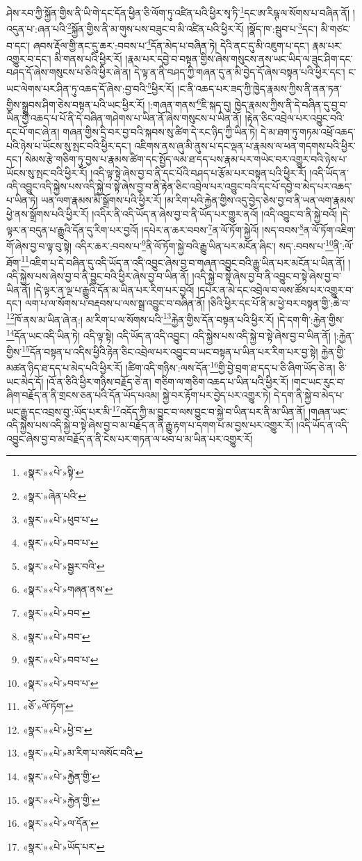 ཤེས་རབ་ཀྱི་སྐྱོན་གྱིས་ནི་ཡི་གེ་དང་དོན་ཕྱིན་ཅི་ལོག་ཏུ་འཛིན་པའི་ཕྱིར་སྭ་ཏི་\footnote{«སྣར་»«པེ་»སྟི་}དང་ཨ་རིཥྚ་ལ་སོགས་པ་བཞིན་ནོ། །འདུན་པ་:ཞན་པའི་\footnote{«སྣར་»ཞེན་པའི་}སྐྱོན་གྱིས་ནི་མ་གུས་པས་བཟུང་བ་མི་འཛིན་པའི་ཕྱིར་རོ། །སྣོད་ཁ་:སྦུབ་པ་\footnote{«སྣར་»«པེ་»ཕུབ་པ་}དང་། མི་གཙང་བ་དང་། ཞབས་རྡོལ་གྱི་ནང་དུ་ཆར་:བབས་པ་\footnote{«སྣར་»«པེ་»བབ་པ་}དོན་མེད་པ་བཞིན་ཏེ། དེའི་ནང་དུ་མི་འཇུག་པ་དང་། རྣམ་པར་འགྱུར་བ་དང་། མི་གནས་པའི་ཕྱིར་རོ། །རྣམ་པར་དབྱེ་བ་བསྟན་གྱིས་ཞེས་གསུངས་ནས་ཡང་ཡིད་ལ་ཟུང་ཤིག་དང་བཤད་དོ་ཞེས་གསུངས་པ་ཅིའི་ཕྱིར་ཞེ་ན། དེ་ལྟ་ན་ནི་བཤད་ཀྱི་གཞན་དུ་ན་མི་བྱེད་དོ་ཞེས་བསྟན་པའི་ཕྱིར་དང་། ང་ཡང་ལེགས་པར་ཤིན་ཏུ་འཆད་དོ་ཞེས་:བྱ་བའི་\footnote{«སྣར་»«པེ་»སྦྱར་བའི་}ཕྱིར་རོ། །ང་ནི་འཆད་པར་ཟད་ཀྱི་ཁྱེད་རྣམས་ཀྱིས་ནི་ནན་ཏན་གྱིས་སྒྲུབས་ཤིག་ཅེས་བསྟན་པའི་ཡང་ཕྱིར་རོ། །:གཞན་གནས་\footnote{«སྣར་»«པེ་»གཞན་ནས་}ཇི་སྐད་དུ། ཁྱེད་རྣམས་ཀྱིས་ནི་དེ་བཞིན་དུ་བྱ་བ་ཡིན་གྱི་འཆད་པ་པོ་ནི་དེ་བཞིན་གཤེགས་པ་ཡིན་ནོ་ཞེས་གསུངས་པ་ཡིན་ནོ། །རྟེན་ཅིང་འབྲེལ་པར་འབྱུང་བའི་དང་པོ་གང་ཞེ་ན། གཞན་གྱིས་དྲི་བར་བྱ་བའི་སྐབས་སུ་ཚིག་དེ་རང་ཉིད་ཀྱི་ཡིན་ཏེ། དེ་མ་ཐག་ཏུ་གཏམ་འཕྲོ་འཆད་པའི་ཉེས་པ་ཡོངས་སུ་སྤང་བའི་ཕྱིར་དང་། འཇིགས་ནས་ཞུ་མི་ནུས་པ་དང་ལྡན་པ་རྣམས་ལ་ཕན་གདགས་པའི་ཕྱིར་དང་། སེམས་རྩེ་གཅིག་ཏུ་བྱས་པ་རྣམས་ཚིག་དང་སྤྱོད་ལམ་ཐ་དད་པས་རྣམ་པར་གཡེང་བར་འགྱུར་བའི་ཉེས་པ་ཡོངས་སུ་སྤང་བའི་ཕྱིར་རོ། །འདི་ལྟ་སྟེ་ཞེས་བྱ་བ་ནི་དང་པོའི་བཤད་པ་རྩོམ་པར་བསྟན་པའི་ཕྱིར་རོ། །འདི་ཡོད་ན་འདི་འབྱུང་འདི་སྐྱེས་པས་འདི་སྐྱེ་བ་སྟེ་ཞེས་བྱ་བ་ནི་རྟེན་ཅིང་འབྲེལ་པར་འབྱུང་བའི་དང་པོ་དབྱེ་བ་མེད་པར་འཆད་པ་ཡིན་ཏེ། ཡན་ལག་རྣམས་མི་སྒྲོགས་པའི་ཕྱིར་རོ། །མ་རིག་པའི་རྐྱེན་གྱིས་འདུ་བྱེད་ཅེས་བྱ་བ་ནི་ཡན་ལག་རྣམས་ཕྱེ་ནས་སྒྲོགས་པའི་ཕྱིར་རོ། །འདིར་ནི་འདི་ཡོད་ན་ཞེས་བྱ་བ་ནི་ཡོད་པར་གྱུར་ནའོ། །འདི་འབྱུང་བ་ནི་སྐྱེ་བའོ། །དེ་ལྟར་ན་བདུན་པ་རྒྱུའི་དོན་དུ་རིག་པར་བྱའོ། །དཔེར་ན་ཆར་བབས་\footnote{«སྣར་»«པེ་»བབ་}ན་ལོ་ཏོག་སྐྱེའོ། །སད་བབས་\footnote{«སྣར་»«པེ་»བབ་}ན་ལོ་ཏོག་འཇིག་གོ་ཞེས་བྱ་བ་ལྟ་བུ་སྟེ། འདིར་ཆར་:བབས་པ་\footnote{«སྣར་»«པེ་»བབ་པ་}ནི་ལོ་ཏོག་སྐྱེ་བའི་རྒྱུ་ཡིན་པར་མངོན་ཞིང་། སད་:བབས་པ་\footnote{«སྣར་»«པེ་»བབ་པ་}ནི་:ལོ་ཐོག་\footnote{«ཅོ་»ལོ་ཏོག་}འཇིག་པ་དེ་བཞིན་དུ་འདི་ཡོད་ན་འདི་འབྱུང་ཞེས་བྱ་བ་གཞན་འབྱུང་བའི་རྒྱུ་ཡིན་པར་མངོན་པ་ཡིན་ནོ། །འདི་སྐྱེས་པས་ཞེས་བྱ་བ་ནི་བྱུང་བའི་ཕྱིར་ཞེས་བྱ་བ་ཡིན་ནོ། །འདི་སྐྱེ་བ་སྟེ་ཞེས་བྱ་བ་ནི་འབྱུང་བ་སྟེ་ཞེས་བྱ་བ་ཡིན་ནོ། །དེ་ལྟར་ན་ལྔ་པ་རྒྱུའི་དོན་མ་ཡིན་པར་རིག་པར་བྱའོ། །དཔེར་ན་མེ་དང་འབྲེལ་བ་ལས་ཚོས་པར་འགྱུར་བ་དང་། ལག་པ་ལ་སོགས་པ་བརྡབས་པ་ལས་སྒྲ་འབྱུང་བ་བཞིན་ནོ། །ཅིའི་ཕྱིར་དང་པོ་ནི་མ་ཕྱེ་བར་བསྟན་གྱི་:ཆེ་བ་\footnote{«སྣར་»«པེ་»ཕྱེ་བ་}ཁོ་ནས་མ་ཡིན་ཞེ་ན:། མ་རིག་པ་ལ་སོགས་པའི་\footnote{«སྣར་»«པེ་»མ་རིག་པ་ལསོང་བའི་}རྐྱེན་གྱིས་དོན་བསྟན་པའི་ཕྱིར་རོ། །དེ་དག་གི་:རྐྱེན་གྱིས་\footnote{«སྣར་»«པེ་»རྐྱེན་གྱི་}དོན་ཡང་འདི་ཡིན་ཏེ། འདི་ལྟ་སྟེ། འདི་ཡོད་ན་འདི་འབྱུང་། འདི་སྐྱེས་པས་འདི་སྐྱེ་བ་སྟེ་ཞེས་བྱ་བ་ཡིན་ནོ། །:རྐྱེན་གྱིས་\footnote{«སྣར་»«པེ་»རྐྱེན་གྱི་}དོན་བསྟན་པ་འདིས་ཕྱིའི་རྟེན་ཅིང་འབྲེལ་པར་འབྱུང་བ་ཡང་བསྟན་པ་ཡིན་པར་རིག་པར་བྱ་སྟེ། རྐྱེན་གྱི་མཚན་ཉིད་ཐ་དད་པ་མེད་པའི་ཕྱིར་རོ། །ཚིག་འདི་གཉིས་:ལས་དོན་\footnote{«སྣར་»«པེ་»ལ་དོན་}གྱི་བྱེ་བྲག་ཐ་དད་པ་ཅི་ཞིག་ཡོད་ཅེ་ན། ཅི་ཡང་མེད་དོ། །འོ་ན་ཅིའི་ཕྱིར་གཉིས་བརྗོད་ཅེ་ན། གཅིག་ལ་གཅིག་འཆད་པ་ཡིན་པའི་ཕྱིར་རོ། །གང་ཡང་རུང་བ་ཞིག་བརྗོད་ན་ནི་གྲངས་ཅན་པའི་དོན་ཡོད་པའམ། སྐྱེ་བར་རྟོག་པར་བྱེད་པར་འགྱུར་ཏེ། དེ་དག་ནི་སྐྱེ་བ་མེད་པ་ཡང་རྒྱུ་དང་འབྲས་བུ་:ཡོད་པར་མི་\footnote{«སྣར་»«པེ་»ཡོད་པར་}འདོད་ཀྱི་མ་བྱུང་བ་ལས་བྱུང་བ་སྐྱེ་བ་ཡིན་པར་ནི་མ་ཡིན་ནོ། །གཞན་ཡང་འདི་སྐྱེས་པས་འདི་སྐྱེ་བ་སྟེ་ཞེས་བྱ་བ་མ་བརྗོད་ན་ནི་རྒྱུ་རྟག་པ་དགག་པ་མ་བྱས་པར་འགྱུར་རོ། །འདི་ཡོད་ན་འདི་འབྱུང་ཞེས་བྱ་བ་མ་བརྗོད་ན་ནི་ངེས་པར་གཏན་ལ་ཕབ་པ་མ་ཡིན་པར་འགྱུར་རོ། 